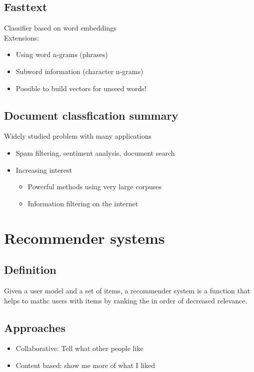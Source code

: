 \subsection{Fasttext}
Classifier based on word embeddings \\
Extensions:
\begin{itemize}
\item Using word n-grams (phrases)
\item Subword information (character n-grams)
\item Possible to build vectors for unseed words!
\end{itemize}

\subsection{Document classfication summary}
Widely studied problem with many applications
\begin{itemize}
\item Spam filtering, sentiment analysis, document search
\item Increasing interest
  \begin{itemize}
  \item Powerful methods using very large corpuses
  \item Information filtering on the internet
  \end{itemize}
\end{itemize}

\section{Recommender systems}
\subsection{Definition}
Given a user model and a set of items, a recommender system is a
function that helps to mathc users with items by ranking the in order
of decreased relevance.

\subsection{Approaches}
\begin{itemize}
\item Collaborative: Tell what other people like
\item Content based: show me more of what I liked
\end{itemize}

